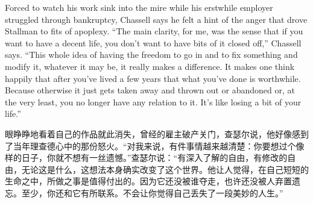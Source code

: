 \ifdefined\eng
Forced to watch his work sink into the mire while his erstwhile employer struggled through bankruptcy, Chassell says he felt a hint of the anger that drove Stallman to fits of apoplexy. ``The main clarity, for me, was the sense that if you want to have a decent life, you don't want to have bits of it closed off,'' Chassell says. ``This whole idea of having the freedom to go in and to fix something and modify it, whatever it may be, it really makes a difference. It makes one think happily that after you've lived a few years that what you've done is worthwhile. Because otherwise it just gets taken away and thrown out or abandoned or, at the very least, you no longer have any relation to it. It's like losing a bit of your life.''
\fi

\ifdefined\chs
眼睁睁地看着自己的作品就此消失，曾经的雇主破产关门，查瑟尔说，他好像感到了当年理查德心中的那份怒火。``对我来说，有件事情越来越清楚：你要想过个像样的日子，你就不想有一丝遗憾。''查瑟尔说：``有深入了解的自由，有修改的自由，无论这是什么，这想法本身确实改变了这个世界。他让人觉得，在自己短短的生命之中，所做之事是值得付出的。因为它还没被谁夺走，也许还没被人弃置遗忘。至少，你还和它有所联系。不会让你觉得自己丢失了一段美妙的人生。''
\fi

\bigskip

\theendnotes
\setcounter{endnote}{0}
